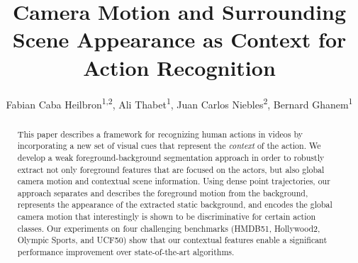 \documentclass[runningheads]{llncs}
\begin{document}
\newcommand{\point}{
    \raise0.7ex\hbox{.}
    }


\pagestyle{headings}

\mainmatter

\title{Camera Motion and Surrounding Scene Appearance as Context for Action Recognition} %



\author{Fabian Caba Heilbron\textsuperscript{1,2}, Ali Thabet\textsuperscript{1}, Juan Carlos Niebles\textsuperscript{2}, Bernard Ghanem\textsuperscript{1}} %

\maketitle

\begin{abstract}
This paper describes a framework for recognizing human actions in videos by incorporating a new set of visual cues that represent the \emph{context} of the action. We develop a weak foreground-background segmentation approach in order to robustly extract not only foreground features that are focused on the actors, but also global camera motion and contextual scene information. Using dense point trajectories, our approach separates and describes the foreground motion from the background, represents the appearance of the extracted static background, and encodes the global camera motion that interestingly is shown to be discriminative for certain action classes. Our experiments on four challenging benchmarks (HMDB51, Hollywood2, Olympic Sports, and UCF50) show that our contextual features enable a significant performance improvement over state-of-the-art algorithms.
\end{abstract}
\end{document}
